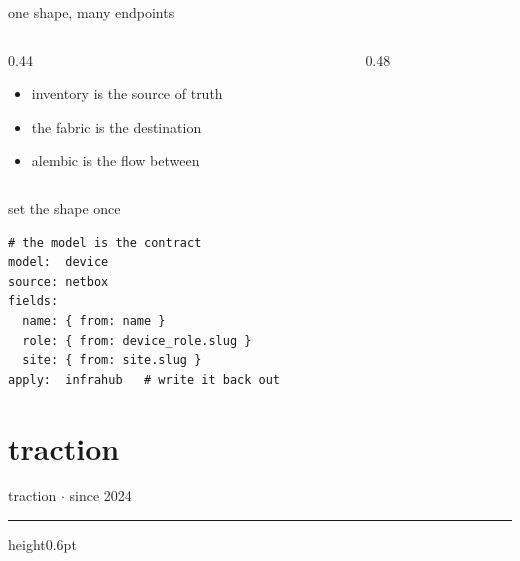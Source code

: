 \documentclass[aspectratio=169,11pt]{beamer}
\begin{document}
\begin{frame}{one shape, many endpoints}
  \begin{columns}[T]
    \begin{column}{0.44\textwidth}
      \begin{itemize}\setlength\itemsep{0.8em}
        \item inventory is the source of truth
        \item the fabric is the destination
        \item alembic is the flow between
      \end{itemize}
      \vskip10pt
    \end{column}
    \begin{column}{0.48\textwidth}
    \end{column}
  \end{columns}
\end{frame}

\begin{frame}[fragile]{set the shape once}
\begin{lstlisting}
# the model is the contract
model:  device
source: netbox
fields:
  name: { from: name }
  role: { from: device_role.slug }
  site: { from: site.slug }
apply:  infrahub   # write it back out
\end{lstlisting}
\end{frame}

\section{traction}

\begin{frame}{}
  \paperheight
  {\color{cwFaint}\small traction $\cdot$ since 2024}\par\vskip10pt
  \paperheight
  {\color{cwRule}\hrule height0.6pt}\vskip14pt
\end{frame}
\end{document}
